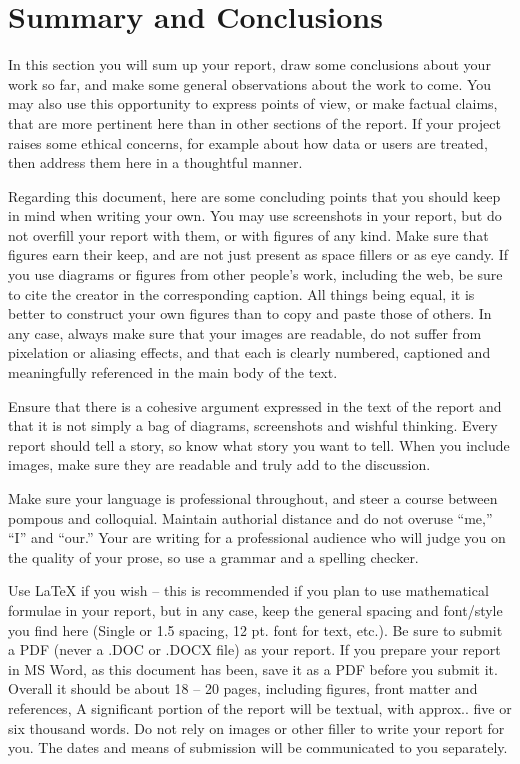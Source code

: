 \documentclass[]{UCD_CS_FYP_Report}
\begin{document}
\chapter{Summary and Conclusions}
In this section you will sum up your report, draw some conclusions about your work so far, and make some general observations about the work to come. You may also use this opportunity to express points of view, or make factual claims, that are more pertinent here than in other sections of the report. If your project raises some ethical concerns, for example about how data or users are treated, then address them here in a thoughtful manner.

Regarding this document, here are some concluding points that you should keep in mind when writing your own. You may use screenshots in your report, but do not overfill your report with them, or with figures of any kind. Make sure that figures earn their keep, and are not just present as space fillers or as eye candy. If you use diagrams or figures from other people’s work, including the web, be sure to cite the creator in the corresponding caption. All things being equal, it is better to construct your own figures than to copy and paste those of others. In any case, always make sure that your images are readable, do not suffer from pixelation or aliasing effects, and that each is clearly numbered, captioned and meaningfully referenced in the main body of the text.

Ensure that there is a cohesive argument expressed in the text of the report and that it is not simply a bag of diagrams, screenshots and wishful thinking. Every report should tell a story, so know what story you want to tell. When you include images, make sure they are readable and truly add to the discussion.

Make sure your language is professional throughout, and steer a course between pompous and colloquial. Maintain authorial distance and do not overuse “me,” “I” and “our.” Your are writing for a professional audience who will judge you on the quality of your prose, so use a grammar and a spelling checker.

Use LaTeX if you wish – this is recommended if you plan to use mathematical formulae in your report, but in any case, keep the general spacing and font/style you find here (Single or 1.5 spacing, 12 pt. font for text, etc.). Be sure to submit a PDF (never a .DOC or .DOCX file) as your report. If you prepare your report in MS Word, as this document has been, save it as a PDF before you submit it. Overall it should be about 18 – 20 pages, including figures, front matter and references, A significant portion of the report will be textual, with approx.. five or six thousand words. Do not rely on images or other filler to write your report for you.
The dates and means of submission will be communicated to you separately.
\end{document}
